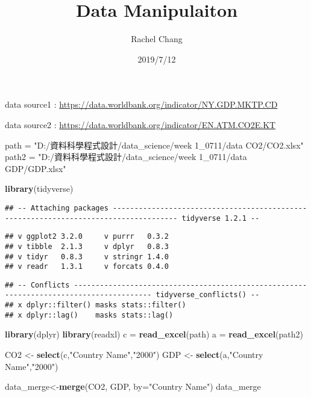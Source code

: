 \documentclass[]{article}
\title{Data Manipulaiton}
\author{Rachel Chang}
\date{2019/7/12}
\newenvironment{Shaded}{\begin{snugshade}}{\end{snugshade}}
\newcommand{\DataTypeTok}[1]{\textcolor[rgb]{0.13,0.29,0.53}{#1}}
\newcommand{\KeywordTok}[1]{\textcolor[rgb]{0.13,0.29,0.53}{\textbf{#1}}}
\newcommand{\NormalTok}[1]{#1}
\newcommand{\StringTok}[1]{\textcolor[rgb]{0.31,0.60,0.02}{#1}}
\begin{document}
\maketitle

data source1 : \url{https://data.worldbank.org/indicator/NY.GDP.MKTP.CD}

data source2 : \url{https://data.worldbank.org/indicator/EN.ATM.CO2E.KT}

\begin{Shaded}
\begin{Highlighting}[]
\NormalTok{path =}\StringTok{ "D:/資料科學程式設計/data_science/week 1_0711/data CO2/CO2.xlsx"}
\NormalTok{path2 =}\StringTok{ "D:/資料科學程式設計/data_science/week 1_0711/data GDP/GDP.xlsx"}

\KeywordTok{library}\NormalTok{(tidyverse)}
\end{Highlighting}
\end{Shaded}

\begin{verbatim}
## -- Attaching packages ------------------------------------------------------------------------------------- tidyverse 1.2.1 --
\end{verbatim}

\begin{verbatim}
## v ggplot2 3.2.0     v purrr   0.3.2
## v tibble  2.1.3     v dplyr   0.8.3
## v tidyr   0.8.3     v stringr 1.4.0
## v readr   1.3.1     v forcats 0.4.0
\end{verbatim}

\begin{verbatim}
## -- Conflicts ---------------------------------------------------------------------------------------- tidyverse_conflicts() --
## x dplyr::filter() masks stats::filter()
## x dplyr::lag()    masks stats::lag()
\end{verbatim}

\begin{Shaded}
\begin{Highlighting}[]
\KeywordTok{library}\NormalTok{(dplyr) }
\KeywordTok{library}\NormalTok{(readxl)}
\NormalTok{c =}\StringTok{ }\KeywordTok{read_excel}\NormalTok{(path)}
\NormalTok{a =}\StringTok{ }\KeywordTok{read_excel}\NormalTok{(path2)}

\NormalTok{CO2 <-}\StringTok{ }\KeywordTok{select}\NormalTok{(c,}\StringTok{"Country Name"}\NormalTok{,}\StringTok{"2000"}\NormalTok{)}
\NormalTok{GDP <-}\StringTok{ }\KeywordTok{select}\NormalTok{(a,}\StringTok{"Country Name"}\NormalTok{,}\StringTok{"2000"}\NormalTok{)}

\NormalTok{data_merge<-}\KeywordTok{merge}\NormalTok{(CO2, GDP, }\DataTypeTok{by=}\StringTok{"Country Name"}\NormalTok{)}
\NormalTok{data_merge}
\end{Highlighting}
\end{Shaded}
\end{document}
